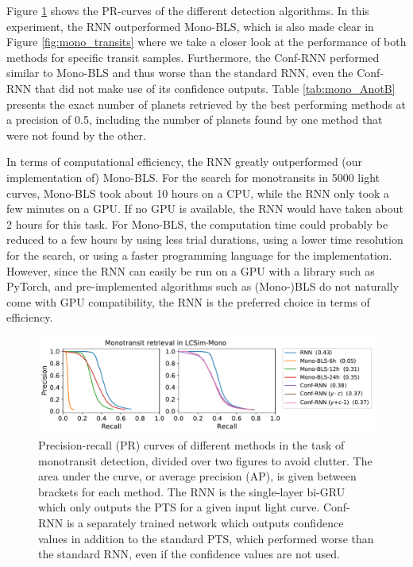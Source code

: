 Figure \ref{fig:mono_pr} shows the PR-curves of the different detection algorithms. In this experiment, the RNN outperformed Mono-BLS, which is also made clear in Figure \ref{fig:mono_transits} where we take a closer look at the performance of both methods for specific transit samples. Furthermore, the Conf-RNN performed similar to Mono-BLS and thus worse than the standard RNN, even the Conf-RNN that did not make use of its confidence outputs. Table \ref{tab:mono_AnotB} presents the exact number of planets retrieved by the best performing methods at a precision of 0.5, including the number of planets found by one method that were not found by the other.

In terms of computational efficiency, the RNN greatly outperformed (our implementation of) Mono-BLS. For the search for monotransits in 5000 light curves, Mono-BLS took about 10 hours on a CPU, while the RNN only took a few minutes on a GPU. If no GPU is available, the RNN would have taken about 2 hours for this task. For Mono-BLS, the computation time could probably be reduced to a few hours by using less trial durations, using a lower time resolution for the search, or using a faster programming language for the implementation. However, since the RNN can easily be run on a GPU with a library such as PyTorch, and pre-implemented algorithms such as (Mono-)BLS do not naturally come with GPU compatibility, the RNN is the preferred choice in terms of efficiency.


\begin{figure}
    \centering
    \includegraphics[width=0.8\linewidth]{Experiments/Figures/Monos/mono_pr.pdf}
    \caption{Precision-recall (PR) curves of different methods in the task of monotransit detection, divided over two figures to avoid clutter. The area under the curve, or average precision (AP), is given between brackets for each method. The RNN is the single-layer bi-GRU which only outputs the PTS for a given input light curve. Conf-RNN is a separately trained network which outputs confidence values in addition to the standard PTS, which performed worse than the standard RNN, even if the confidence values are not used.}
    \label{fig:mono_pr}
\end{figure}

